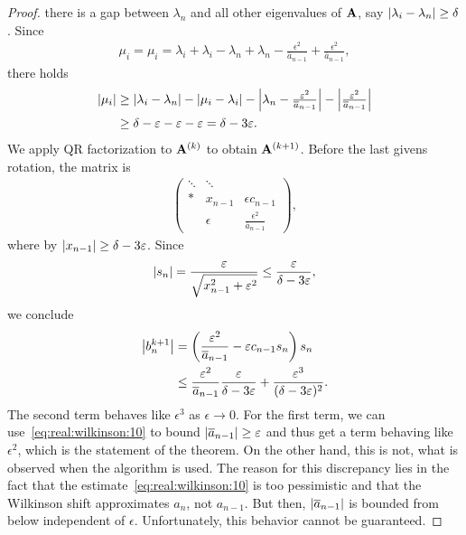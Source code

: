 \begin{proof}
there is a gap between $\lambda_n$ and all other eigenvalues of
$\mata$, say $\abs{\lambda_i-\lambda_n}\ge \delta$.  Since
\begin{gather}
  \mu_i = \mu_i = \lambda_i+\lambda_i-\lambda_n+\lambda_n
  -\tfrac{\epsilon^2}{\overline a_{n-1}}+\tfrac{\epsilon^2}{\overline a_{n-1}},
\end{gather}
there holds
\begin{align}
  \abs*{\mu_i}
  &\ge \abs*{\lambda_i-\lambda_n} - \abs*{\mu_i-\lambda_i}
    - \abs*{\lambda_n - \tfrac{\epsilon^2}{\overline a_{n-1}}}
    - \abs*{\tfrac{\epsilon^2}{\overline a_{n-1}}}\\
  &\ge \delta - \epsilon - \epsilon -\epsilon = \delta-3\epsilon.
\end{align}
We apply QR factorization to $\mata^{(k)}$ to obtain
$\mata^{(k+1)}$. Before the last givens rotation, the matrix is
\begin{gather}
  \begin{pmatrix}
    \ddots&\ddots&\\
    * & x_{n-1} & \epsilon c_{n-1}\\
    & \epsilon & \tfrac{\epsilon^2}{\overline a_{n-1}}
  \end{pmatrix},
\end{gather}
where by  $\abs{x_{n-1}} \ge \delta-3\epsilon$. Since
\begin{gather}
  \abs{s_n} = \frac{\epsilon}{\sqrt{x_{n-1}^2+\epsilon^2}} \le \frac{\epsilon}{\delta-3\epsilon},
\end{gather}
we conclude
\begin{align}
  \abs*{b_n^{k+1}}
  &= \left(\frac{\epsilon^2}{\overline a_{n-1}} - \epsilon c_{n-1}s_n \right) s_n\\
  &\le \frac{\epsilon^2}{\overline a_{n-1}} \frac{\epsilon}{\delta-3\epsilon}
    + \frac{\epsilon^3}{(\delta-3\epsilon)^2}.
\end{align}
The second term behaves like $\epsilon^3$ as $\epsilon\to0$. For the
first term, we can use~\eqref{eq:real:wilkinson:10} to bound
$\abs{\overline a_{n-1}}\ge\epsilon$ and thus get a term behaving like
$\epsilon^2$, which is the statement of the theorem. On the other
hand, this is not, what is observed when the algorithm is used. The
reason for this discrepancy lies in the fact that the
estimate~\eqref{eq:real:wilkinson:10} is too pessimistic and that the
Wilkinson shift approximates $a_n$, not $a_{n-1}$. But then,
$\abs{\overline a_{n-1}}$ is bounded from below independent of
$\epsilon$. Unfortunately, this behavior cannot be guaranteed.
\end{proof}

